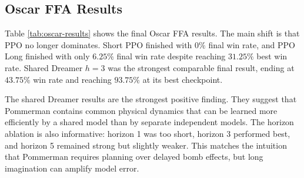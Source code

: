\documentclass[11pt]{article}
\begin{document}
\subsection{Oscar FFA Results}

Table \ref{tab:oscar-results} shows the final Oscar FFA results. The main shift is that PPO no longer dominates. Short PPO finished with $0\%$ final win rate, and PPO Long finished with only $6.25\%$ final win rate despite reaching $31.25\%$ best win rate. Shared Dreamer $h=3$ was the strongest comparable final result, ending at $43.75\%$ win rate and reaching $93.75\%$ at its best checkpoint.

\begin{table}[H]
\centering
{}
\caption{Oscar FFA results. Shared Dreamer with horizon 3 was the strongest comparable final result. PPO improved somewhat with longer training, but had low final win rate under the sparse terminal-win metric.}
\label{tab:oscar-results}
\end{table}

The shared Dreamer results are the strongest positive finding. They suggest that Pommerman contains common physical dynamics that can be learned more efficiently by a shared model than by separate independent models. The horizon ablation is also informative: horizon 1 was too short, horizon 3 performed best, and horizon 5 remained strong but slightly weaker. This matches the intuition that Pommerman requires planning over delayed bomb effects, but long imagination can amplify model error.
\end{document}
